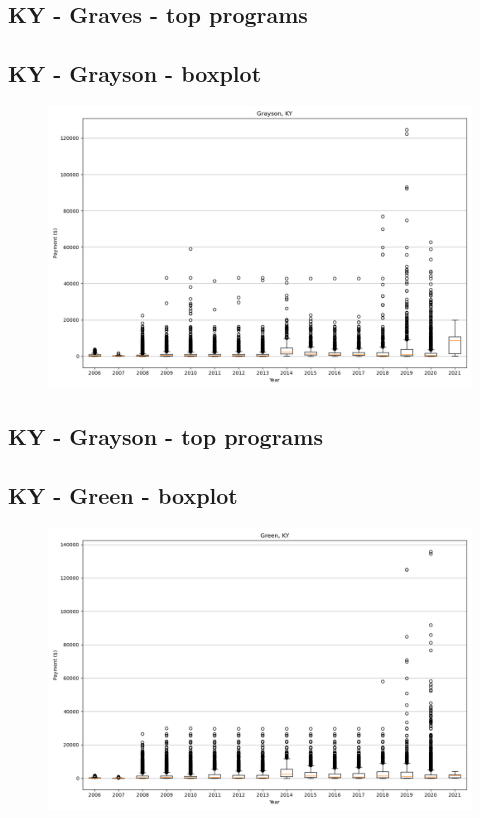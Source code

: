 \subsection*{KY - Graves - top programs}

\newpage
\subsection*{KY - Grayson - boxplot}
\begin{figure}[h]
\centering
\includegraphics[width=7in]{../output/boxplots/counties/Grayson-KY_boxplot.png}
\end{figure}


\subsection*{KY - Grayson - top programs}

\newpage
\subsection*{KY - Green - boxplot}
\begin{figure}[h]
\centering
\includegraphics[width=7in]{../output/boxplots/counties/Green-KY_boxplot.png}
\end{figure}


